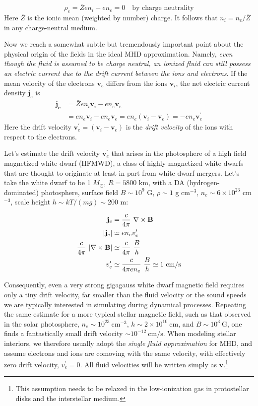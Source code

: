 \documentclass[notoc]{tufte-handout}
\renewcommand{\vec}[1]{
\mathbf{#1}
}
\newcommand{\del}{
\vec{\nabla}
}
\newcommand{\B}{
\vec{B}
}
\begin{document}
\begin{equation}
\rho_e = \bar {Z} e n_i - en_e = 0 \quad \text{by charge neutrality}
\end{equation}
%
Here $\bar {Z}$ is the ionic mean (weighted by number) charge. It follows that $n_i = n_e / \bar {Z}$ in any charge-neutral medium. 

Now we reach a somewhat subtle but tremendously important point about the physical origin of the fields in the ideal MHD approximation. Namely, {\it even though the fluid is assumed to be charge neutral, an ionized fluid can still possess an electric current due to the drift current between the ions and electrons}. If the mean velocity of the electrons $\vec{v}_e$ differs from the ions $\vec{v}_i$, the net electric current density $\vec {j}_e$ is
\begin{align}
\vec{j_e} & = \bar {Z}en_i \vec{v}_i - en_e \vec{v}_e \\
& = en_e \vec{v}_i - en_e\vec{v}_e = en_e (\vec{v}_i - \vec{v}_e) = -en_e \vec{v}_e^\prime
\end{align}
%
Here the drift velocity $\vec{v}_e^\prime =  (\vec{v}_i - \vec{v}_e)$ is the {\it drift velocity} of the ions with respect to the electrons. 

Let's estimate the drift velocity $\vec{v}_e^\prime$ that arises in the photosphere of a high field magnetized white dwarf (HFMWD), a class of highly magnetized white dwarfs that are thought to originate at least in part from white dwarf mergers. Let's take the white dwarf to be 1 $M_{\odot}$, $R = 5800$ km, with a  DA (hydrogen-dominated) photosphere,  surface field $B \sim 10^9$ G, $\rho \sim 1$ g cm$^{-3}$, $n_e \sim 6 \times 10^{23}$ cm$^{-3}$, scale height $h \sim k T /  (m g) \sim 200$ m:

\begin{align}
\vec{j}_e & = \frac{c}{4\pi} ~\del \times \B  \\
\abs{\vec{j}_e} & \simeq e n_e {v}_e^\prime \\
\frac{c}{4\pi}~\abs{\del \times \B} & \simeq \frac{c}{4\pi}~\frac{B}{h} \\
v_e^\prime &\simeq \frac{c}{4\pi e n_e}~\frac{B}{h} \simeq 1 ~\text{cm/s}
\end{align}

Consequently, even a very strong gigagauss white dwarf magnetic field requires only a tiny drift velocity, far smaller than the fluid velocity or the sound speeds we are typically interested in simulating during dynamical processes.  Repeating the same estimate for a more typical stellar magnetic field, such as that observed in the solar photosphere, $n_e \sim 10^{23}~$cm$^{-3}$, $h\sim 2\times 10^{10}~$cm, and $B\sim 10^3~$G, one finds a fantastically small drift velocity $\sim 10^{-12}~\text{cm/s}$. When modeling stellar interiors, we therefore usually adopt the \textit{single fluid approximation} for MHD, and assume electrons and ions  are comoving with the same velocity, with effectively zero drift velocity, $v_e^\prime=0$. All fluid velocities will be written simply as $\vec {v}$.\footnote{This assumption needs to be relaxed in the low-ionization gas in protostellar disks and the interstellar medium.}
\end{document}
